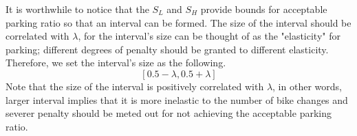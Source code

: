 \documentclass[a4paper, 12pt]{article}%
\theoremstyle{definition}
\begin{document}



\noindent It is worthwhile to notice that the $S_L$ and $S_H$ provide bounds for acceptable parking ratio so that an interval can be formed. The size of the interval should be correlated with $\lambda$, for the interval's size can be thought of as the "elasticity" for parking; different degrees of penalty should be granted to different elasticity.
Therefore, we set the interval's size as the following.
\[[0.5 - \lambda, 0.5 + \lambda]\]
Note that the size of the interval is positively correlated with $\lambda$, in other words, larger interval implies that it is more inelastic to the number of bike changes and severer penalty should be meted out for not achieving the acceptable parking ratio.



\end{document}
